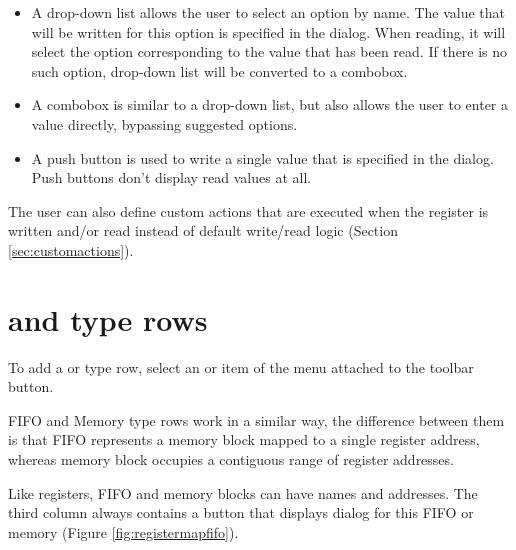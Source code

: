 \documentclass[a4paper,12pt,twoside,extrafontsizes]{memoir}
\begin{document}
\begin{itemize}
	\item A drop-down list allows the user to select an option by name. The value that will be written for this option is specified in the  dialog. When reading, it will select the option corresponding to the value that has been read. If there is no such option, drop-down list will be converted to a combobox.
	\item A combobox is similar to a drop-down list, but also allows the user to enter a value directly, bypassing suggested options.
	\item A push button is used to write a single value that is specified in the  dialog. Push buttons don't display read values at all.
\end{itemize}

The user can also define custom actions that are executed when the register is written and/or read instead of default write/read logic (Section \ref{sec:customactions}).

\section[FIFO and Memory type rows]{ and  type rows}

To add a  or  type row, select an  or  item of the menu attached to the  toolbar button.

FIFO and Memory type rows work in a similar way, the difference between them is that FIFO represents a memory block mapped to a single register address, whereas memory block occupies a contiguous range of register addresses.

Like registers, FIFO and memory blocks can have names and addresses. The third column always contains a button that displays  dialog for this FIFO or memory (Figure \ref{fig:registermapfifo}).
\end{document}
